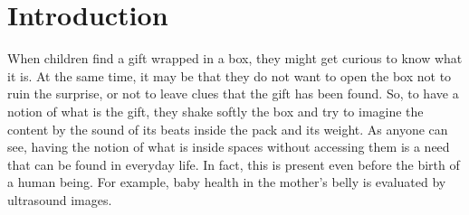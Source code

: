 
\chapter{Introduction}\label{chap:introduction}

	\setcounter{page}{22}

	When children find a gift wrapped in a box, they might get curious to know what it is. At the same time, it may be that they do not want to open the box not to ruin the surprise, or not to leave clues that the gift has been found. So, to have a notion of what is the gift, they shake softly the box and try to imagine the content by the sound of its beats inside the pack and its weight. As anyone can see, having the notion of what is inside spaces without accessing them is a need that can be found in everyday life. In fact, this is present even before the birth of a human being. For example, baby health in the mother's belly is evaluated by ultrasound images.
	
